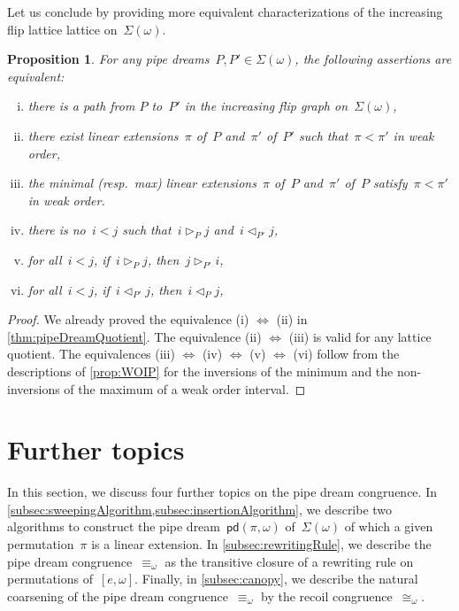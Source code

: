 \documentclass{amsart}
\newtheorem{proposition}[theorem]{Proposition}
\theoremstyle{definition}
\newcommand{\acyclicPipeDreams}{\Sigma} %
\newcommand{\insertion}[2]{\mathsf{pd}(#1,#2)} %
\newcommand{\less}{\vartriangleleft} %
\newcommand{\more}{\vartriangleright} %
\newcommand{\contactLess}[1]{\less_{#1}} %
\newcommand{\contactMore}[1]{\more_{#1}} %
\begin{document}
Let us conclude by providing more equivalent characterizations of the increasing flip lattice lattice on~$\acyclicPipeDreams(\omega)$.

\begin{proposition}
For any pipe dreams~$P, P' \in \acyclicPipeDreams(\omega)$, the following assertions are equivalent:
\begin{enumerate}[(i)]
\item there is a path from $P$ to~$P'$ in the increasing flip graph on~$\acyclicPipeDreams(\omega)$,
\item there exist linear extensions~$\pi$ of~$P$ and~$\pi'$ of~$P'$ such that~$\pi < \pi'$ in weak order,
\item the minimal (resp.~max) linear extensions~$\pi$ of~$P$ and~$\pi'$ of~$P$ satisfy~$\pi < \pi'$ in weak order.
\item there is no~$i < j$ such that~$i \contactMore{P} j$ and~$i \contactLess{P'} j$,
\item for all~$i < j$, if~$i \contactMore{P} j$, then~$j \contactMore{P'} i$,
\item for all~$i < j$, if~$i \contactLess{P'} j$, then~$i \contactLess{P} j$,
\end{enumerate}
\end{proposition}

\begin{proof}
We already proved the equivalence (i) $\Leftrightarrow$ (ii) in \cref{thm:pipeDreamQuotient}.
The equivalence (ii) $\Leftrightarrow$ (iii) is valid for any lattice quotient.
The equivalences (iii) $\Leftrightarrow$ (iv) $\Leftrightarrow$ (v) $\Leftrightarrow$ (vi) follow from the descriptions of \cref{prop:WOIP} for the inversions of the minimum and the non-inversions of the maximum of a weak order interval.
\end{proof}


\section{Further topics}
\label{sec:furtherTopics}

In this section, we discuss four further topics on the pipe dream congruence.
In \cref{subsec:sweepingAlgorithm,subsec:insertionAlgorithm}, we describe two algorithms to construct the pipe dream~$\insertion{\pi}{\omega}$ of~$\acyclicPipeDreams(\omega)$ of which a given permutation~$\pi$ is a linear extension.
In \cref{subsec:rewritingRule}, we describe the pipe dream congruence~$\equiv_\omega$ as the transitive closure of a rewriting rule on permutations of~$[e, \omega]$.
Finally, in \cref{subsec:canopy}, we describe the natural coarsening of the pipe dream congruence~$\equiv_\omega$ by the recoil congruence~$\cong_\omega$.
\end{document}
